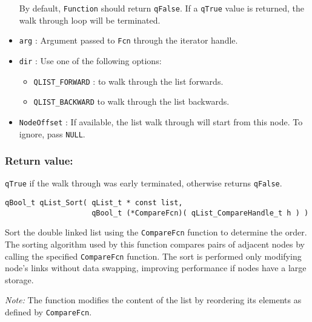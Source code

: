 \begin{itemize}
                            By default, \lstinline{Function} should return \lstinline{qFalse}. If a \lstinline{qTrue} value is returned, the walk through loop will be terminated.
    \item \lstinline{arg} : Argument passed to \lstinline{Fcn} through the iterator handle.
    \item \lstinline{dir} : Use one of the following options:
                            \begin{itemize}
                                \item \lstinline{QLIST_FORWARD} : to walk through the list forwards.
                                \item \lstinline{QLIST_BACKWARD} to walk through the list backwards.
                            \end{itemize}
    \item \lstinline{NodeOffset} : If available, the list walk through will start from this node.  
                   To ignore, pass \lstinline{NULL}.
\end{itemize}

\subsubsection*{Return value:}
\lstinline{qTrue} if the walk through was early terminated, otherwise returns \lstinline{qFalse}.

\noindent\hrulefill

\begin{lstlisting}[style=CStyle]
qBool_t qList_Sort( qList_t * const list, 
                    qBool_t (*CompareFcn)( qList_CompareHandle_t h ) ) 
\end{lstlisting} 

Sort the double linked list using the \lstinline{CompareFcn} function to 
determine the order.
The sorting algorithm used by this function compares pairs of adjacent nodes by calling the specified \lstinline{CompareFcn} function. The sort is performed only modifying node's links without data swapping, improving performance if nodes have a large storage.

\textit{Note:} The function modifies the content of the list by reordering its 
elements as defined by \lstinline{CompareFcn}.

